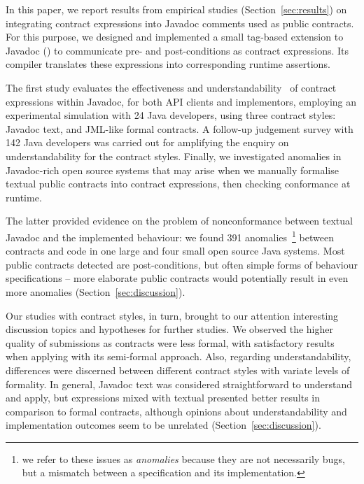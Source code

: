 In this paper, we report results from empirical studies (Section~\ref{sec:results}) on integrating contract expressions into Javadoc comments used as public contracts. 
For this purpose, we designed and implemented a small tag-based extension to Javadoc (\contractjdoc{}) to communicate pre- and post-conditions as contract expressions.
Its compiler translates these expressions into corresponding runtime assertions.

The first study evaluates the effectiveness and understandability~\cite{Scalabrino2017} of contract expressions within Javadoc, for both API clients and implementors, employing an experimental simulation with 24 Java developers, using three contract styles: Javadoc text, \contractjdoc{} and JML-like formal contracts. 
A follow-up judgement survey with 142 Java developers was carried out for amplifying the enquiry on understandability for the contract styles. Finally, we investigated anomalies in Javadoc-rich open source systems that may arise when we manually formalise textual public contracts into contract expressions, then checking conformance at runtime.

The latter provided evidence on the problem of nonconformance between textual Javadoc and the implemented behaviour: we found 391 anomalies~\footnote{we refer to these issues as \emph{anomalies} because they are not necessarily bugs, but a mismatch between a specification and its implementation.} between contracts and code in one large and four small open source Java systems. Most public contracts detected are post-conditions, but often simple forms of behaviour specifications -- more elaborate public contracts would potentially result in even more anomalies (Section~\ref{sec:discussion}).

Our studies with contract styles, in turn, brought to our attention interesting discussion topics and hypotheses for further studies. 
We observed the higher quality of submissions as contracts were less formal, with satisfactory results when applying \contractjdoc{} with its semi-formal approach. Also, regarding understandability, differences were discerned between different contract styles with variate levels of formality.
In general, Javadoc text was considered straightforward to understand and apply, but \contractjdoc{} expressions mixed with textual presented better results in comparison to formal contracts, although opinions about understandability and implementation outcomes seem to be unrelated (Section~\ref{sec:discussion}).

